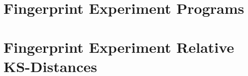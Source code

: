 \section{Fingerprint Experiment Programs}



\section{Fingerprint Experiment Relative KS-Distances}

